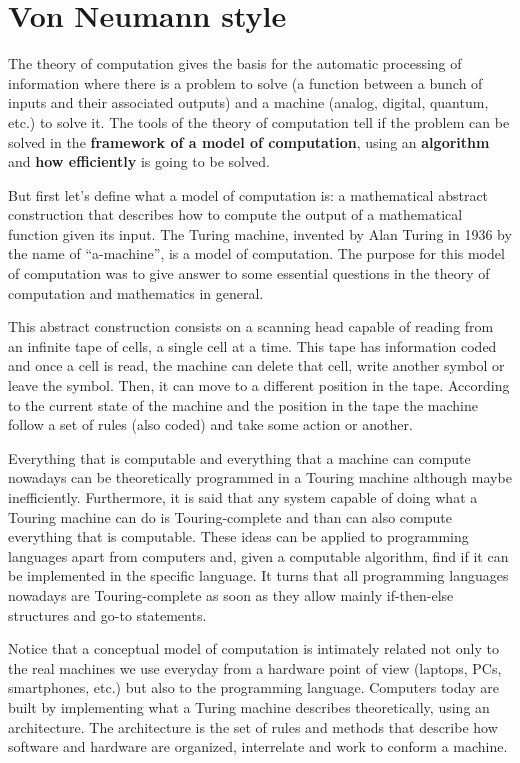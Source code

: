  


    \newpage   
    \section{Von Neumann style}  \label{sec:vonNeu}
The theory of computation gives the basis for the automatic processing of information where there is a 
problem to solve (a function between a bunch of inputs and their associated outputs) 
and a machine (analog, digital, quantum, etc.) to solve it. 
The tools of the theory of computation tell 
if the problem can be solved in the \textbf{framework of a model of computation}, 
using an \textbf{algorithm} and 
\textbf{how efficiently} is going to be solved.

But first let's define what a model of computation is: a mathematical abstract construction 
that describes how to compute the output of a mathematical function given its input.
The Turing machine, invented by Alan Turing in 1936 by the name of ``a-machine'', is a model of computation. 
The purpose for this model of computation was to give answer to some essential questions 
in the theory of computation and mathematics in general. 

This abstract construction consists on a scanning head capable of reading from an 
infinite tape of cells, a single cell at a time. 
This tape has information coded and once a cell is read, the machine can delete that cell, 
write another symbol or leave the symbol. 
Then, it can move to a different position in the tape. 
According to the current state of the 
machine and the position in the tape the machine follow a set of rules (also coded) and take some action or another. 

Everything that is computable and everything that a machine can compute nowadays can be theoretically programmed in a Touring machine 
although maybe inefficiently. 
Furthermore, it is said that any system capable of doing what a Touring machine can do is Touring-complete and 
than can also compute everything that is computable. 
These ideas can be applied to programming languages apart from computers and,
given a computable algorithm, find if it can be implemented in the specific language.
It turns that all programming languages nowadays are Touring-complete as soon as they allow 
mainly if-then-else structures and go-to statements. 

Notice that a conceptual model of computation is intimately related not only to the 
real machines we use everyday from a hardware point of view (laptops, PCs, smartphones, etc.) 
but also to the programming language. 
Computers today are built by implementing what 
a Turing machine describes theoretically, using an architecture. 
The architecture is the set of rules and methods that describe how software 
and hardware are organized, interrelate and work to conform a machine.

